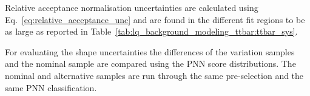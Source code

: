 
Relative acceptance normalisation uncertainties are calculated using Eq.~\ref{eq:relative_acceptance_unc} and are found in the different fit regions 
to be as large as reported in Table~\ref{tab:lq_background_modeling_ttbar:ttbar_sys}.

For evaluating the shape uncertainties the differences of the variation samples and the nominal sample are compared using the PNN score distributions. The nominal and alternative samples are run through the same pre-selection and the same PNN classification. 

